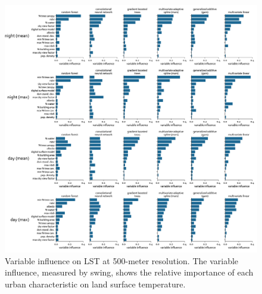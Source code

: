 \documentclass[review]{elsarticle}
\begin{document}
\begin{figure}[h]
    \begin{center}
    \includegraphics[width=\linewidth]{fig/report/importance_500.png}
    \caption[Variable influence on LST at 500-meter resolution]{
    Variable influence on LST at 500-meter resolution.
    The variable influence, measured by swing, shows the relative importance of each urban characteristic on land surface temperature.}
    \label{fig:importance_500}
    \end{center}
\end{figure}
\end{document}
